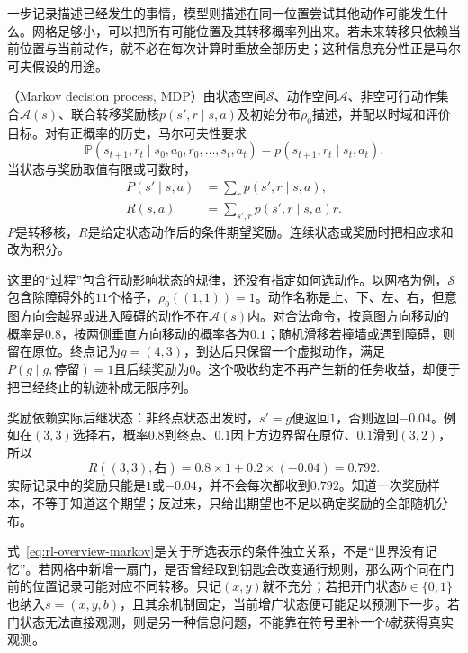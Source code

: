 一步记录描述已经发生的事情，模型则描述在同一位置尝试其他动作可能发生什么。网格足够小，可以把所有可能位置及其转移概率列出来。若未来转移只依赖当前位置与当前动作，就不必在每次计算时重放全部历史；这种信息充分性正是马尔可夫假设的用途。

\begin{definition}[马尔可夫决策过程]
  \label{def:rl-overview-mdp}
  （Markov decision process, MDP）由状态空间$\mathcal S$、动作空间$\mathcal A$、非空可行动作集合$\mathcal A(s)$、联合转移奖励核$p(s',r\mid s,a)$及初始分布$\rho_0$描述，并配以时域和评价目标。对有正概率的历史，马尔可夫性要求
  \begin{equation}
    \mathbb P(s_{t+1},r_t\mid s_0,a_0,r_0,\ldots,s_t,a_t)
    =p(s_{t+1},r_t\mid s_t,a_t).
    \label{eq:rl-overview-markov}
  \end{equation}
  当状态与奖励取值有限或可数时，
  \begin{equation}
  \begin{aligned}
    P(s'\mid s,a)&=\sum_r p(s',r\mid s,a),\\
    R(s,a)&=\sum_{s',r}p(s',r\mid s,a)r.
  \end{aligned}
  \label{eq:rl-overview-kernels}
  \end{equation}
  $P$是转移核，$R$是给定状态动作后的条件期望奖励。连续状态或奖励时把相应求和改为积分。
\end{definition}

这里的“过程”包含行动影响状态的规律，还没有指定如何选动作。以网格为例，$\mathcal S$包含除障碍外的$11$个格子，$\rho_0((1,1))=1$。动作名称是上、下、左、右，但意图方向会越界或进入障碍的动作不在$\mathcal A(s)$内。对合法命令，按意图方向移动的概率是$0.8$，按两侧垂直方向移动的概率各为$0.1$；随机滑移若撞墙或遇到障碍，则留在原位。终点记为$g=(4,3)$，到达后只保留一个虚拟动作，满足$P(g\mid g,\text{停留})=1$且后续奖励为$0$。这个吸收约定不再产生新的任务收益，却便于把已经终止的轨迹补成无限序列。

奖励依赖实际后继状态：非终点状态出发时，$s'=g$便返回$1$，否则返回$-0.04$。例如在$(3,3)$选择右，概率$0.8$到终点、$0.1$因上方边界留在原位、$0.1$滑到$(3,2)$，所以
\[
  R((3,3),\text{右})=0.8\times1+0.2\times(-0.04)=0.792.
\]
实际记录中的奖励只能是$1$或$-0.04$，并不会每次都收到$0.792$。知道一次奖励样本，不等于知道这个期望；反过来，只给出期望也不足以确定奖励的全部随机分布。

式~\eqref{eq:rl-overview-markov}是关于所选表示的条件独立关系，不是“世界没有记忆”。若网格中新增一扇门，是否曾经取到钥匙会改变通行规则，那么两个同在门前的位置记录可能对应不同转移。只记$(x,y)$就不充分；若把开门状态$b\in\{0,1\}$也纳入$s=(x,y,b)$，且其余机制固定，当前增广状态便可能足以预测下一步。若门状态无法直接观测，则是另一种信息问题，不能靠在符号里补一个$b$就获得真实观测。

